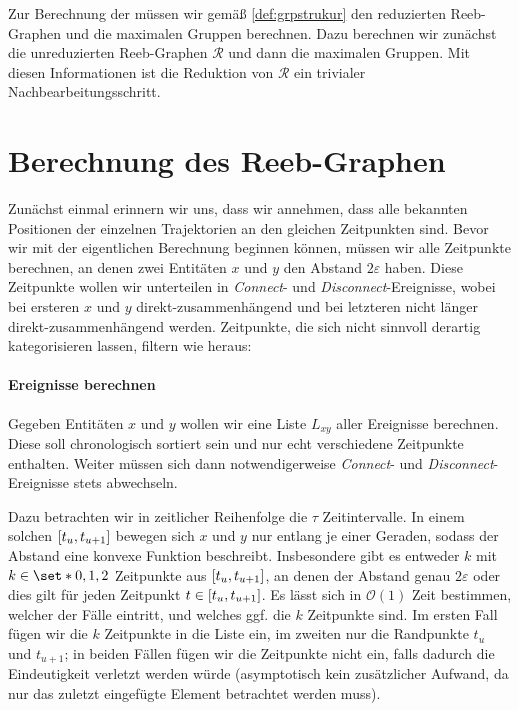 Zur Berechnung der \GrpStruktur müssen wir gemäß \cref{def:grpstrukur} den reduzierten Reeb-Graphen und die maximalen Gruppen berechnen.
Dazu berechnen wir zunächst die unreduzierten Reeb-Graphen $\mathcal{R}$ und dann die maximalen Gruppen. 
Mit diesen Informationen ist die Reduktion von $\mathcal{R}$ ein trivialer Nachbearbeitungsschritt.

\section{Berechnung des Reeb-Graphen} %
\label{sec:berechnung_reeb}
Zunächst einmal erinnern wir uns, dass wir annehmen, dass alle bekannten Positionen der einzelnen Trajektorien an den gleichen Zeitpunkten sind.
Bevor wir mit der eigentlichen Berechnung beginnen können, müssen wir alle Zeitpunkte berechnen, an denen zwei Entitäten $x$ und $y$ den Abstand $2 \varepsilon$ haben.
Diese Zeitpunkte wollen wir unterteilen in \emph{Connect}- und \emph{Disconnect}-Ereignisse, wobei bei ersteren $x$ und $y$ direkt-zusammenhängend und bei letzteren nicht länger direkt-zusammenhängend werden.
Zeitpunkte, die sich nicht sinnvoll derartig kategorisieren lassen, filtern wie heraus:

\paragraph{Ereignisse berechnen} %
\label{par:ereignisse_berechnen}
Gegeben Entitäten $x$ und $y$ wollen wir eine Liste $L_{xy}$ aller Ereignisse berechnen.
Diese soll chronologisch sortiert sein und nur echt verschiedene Zeitpunkte enthalten.
Weiter müssen sich dann notwendigerweise \emph{Connect}- und \emph{Disconnect}-Ereignisse stets abwechseln.

Dazu betrachten wir in zeitlicher Reihenfolge die $\tau$ Zeitintervalle.
In einem solchen $\benbrace*{t_u,t_{u+1}}$ bewegen sich $x$ und $y$ nur entlang je einer Geraden, sodass der Abstand eine konvexe Funktion beschreibt.
Insbesondere gibt es entweder $k$ mit $k \in \set*{0,1,2}$ Zeitpunkte aus $\benbrace*{t_u,t_{u+1}}$, an denen der Abstand genau $2 \varepsilon$ oder dies gilt für jeden Zeitpunkt $t \in \benbrace*{t_u,t_{u+1}}$.
Es lässt sich in $\mathcal{O}(1)$ Zeit bestimmen, welcher der Fälle eintritt, und welches ggf. die $k$ Zeitpunkte sind.
Im ersten Fall fügen wir die $k$ Zeitpunkte in die Liste ein, im zweiten nur die Randpunkte $t_u$ und $t_{u+1}$; in beiden Fällen fügen wir die Zeitpunkte nicht ein, falls dadurch die Eindeutigkeit verletzt werden würde (asymptotisch kein zusätzlicher Aufwand, da nur das zuletzt eingefügte Element betrachtet werden muss).

